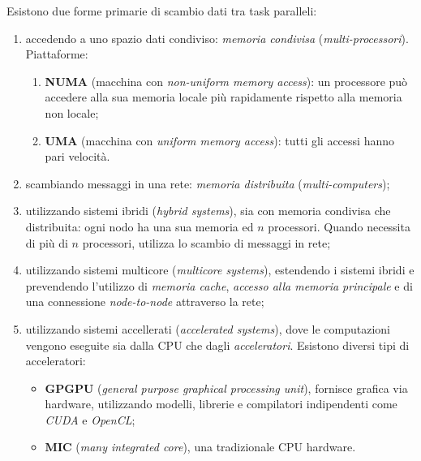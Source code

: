 Esistono due forme primarie di scambio dati tra task paralleli:
\begin{enumerate}
	\item accedendo a uno spazio dati condiviso: \textit{memoria condivisa} (\textit{multi-processori}). Piattaforme:
	\begin{enumerate}
		\item \textbf{NUMA} (macchina con \textit{non-uniform memory access}): un processore può accedere alla sua memoria locale più rapidamente rispetto alla memoria non locale;
		\item \textbf{UMA} (macchina con \textit{uniform memory access}): tutti gli accessi hanno pari velocità.
	\end{enumerate}
	\item scambiando messaggi in una rete: \textit{memoria distribuita} (\textit{multi-computers});
	\item utilizzando sistemi ibridi (\textit{hybrid systems}), sia con memoria condivisa che distribuita: ogni nodo ha una sua memoria ed $n$ processori. Quando necessita di più di $n$ processori, utilizza lo scambio di messaggi in rete;
	\item utilizzando sistemi multicore (\textit{multicore systems}), estendendo i sistemi ibridi e prevendendo l'utilizzo di \textit{memoria cache}, \textit{accesso alla memoria principale} e di una connessione \textit{node-to-node} attraverso la rete;
	\item utilizzando sistemi accellerati (\textit{accelerated systems}), dove le computazioni vengono eseguite sia dalla CPU che dagli \textit{acceleratori}. Esistono diversi tipi di acceleratori:
	\begin{itemize}
		\item \textbf{GPGPU} (\textit{general purpose graphical processing unit}), fornisce grafica via hardware, utilizzando modelli, librerie e compilatori indipendenti come \textit{CUDA} e \textit{OpenCL};
		\item \textbf{MIC} (\textit{many integrated core}), una tradizionale CPU hardware.
	\end{itemize}
\end{enumerate}

